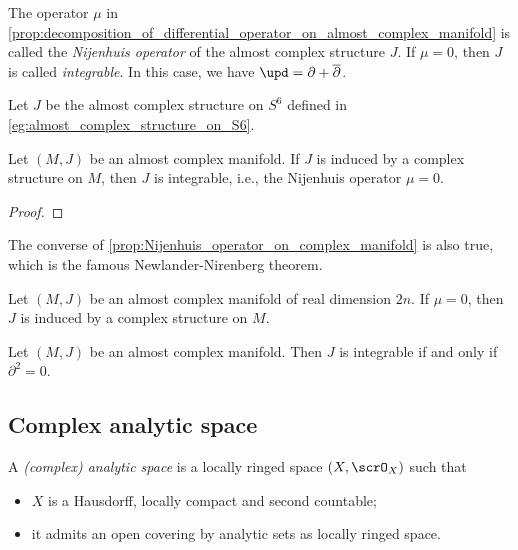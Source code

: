 \begin{definition}\label{def:Nijenhuis_operator}
	The operator \(\mu\) in \cref{prop:decomposition_of_differential_operator_on_almost_complex_manifold} is called the \emph{Nijenhuis operator} of the almost complex structure \(J\).
	If \(\mu = 0\), then \(J\) is called \emph{integrable}.
	In this case, we have \(\upd = \partial + \overline{\partial}\).
\end{definition}

\begin{example}\label{eg:Nijenhuis_operator_on_S6_for_the_almost_complex_structure_on_S6_by_octonion}
	Let \(J\) be the almost complex structure on \(S^6\) defined in \cref{eg:almost_complex_structure_on_S6}.

\end{example}

\begin{proposition}\label{prop:Nijenhuis_operator_on_complex_manifold}
	Let \((M,J)\) be an almost complex manifold.
	If \(J\) is induced by a complex structure on \(M\), then \(J\) is integrable, i.e., the Nijenhuis operator \(\mu = 0\).
\end{proposition}
\begin{proof}
\end{proof}

The converse of \cref{prop:Nijenhuis_operator_on_complex_manifold} is also true, which is the famous Newlander-Nirenberg theorem.

\begin{theorem}\label{thm:newlander_nirenberg_theorem}
	Let \((M,J)\) be an almost complex manifold of real dimension \(2n\).
	If \(\mu = 0\), then \(J\) is induced by a complex structure on \(M\).
\end{theorem}

\begin{proposition}\label{prop:integrable_almost_complex_structure_and_partial_square_zero}
	Let \((M,J)\) be an almost complex manifold.
	Then \(J\) is integrable if and only if \(\partial^2 = 0\).
\end{proposition}


\subsection{Complex analytic space}

\begin{definition}\label{def:complex-analytic-space}
	A \emph{(complex) analytic space} is a locally ringed space $(X, \scrO_X)$ such that
	\begin{itemize}
		\item $X$ is a Hausdorff, locally compact and second countable;
		\item it admits an open covering by analytic sets as locally ringed space.
	\end{itemize}
\end{definition}

